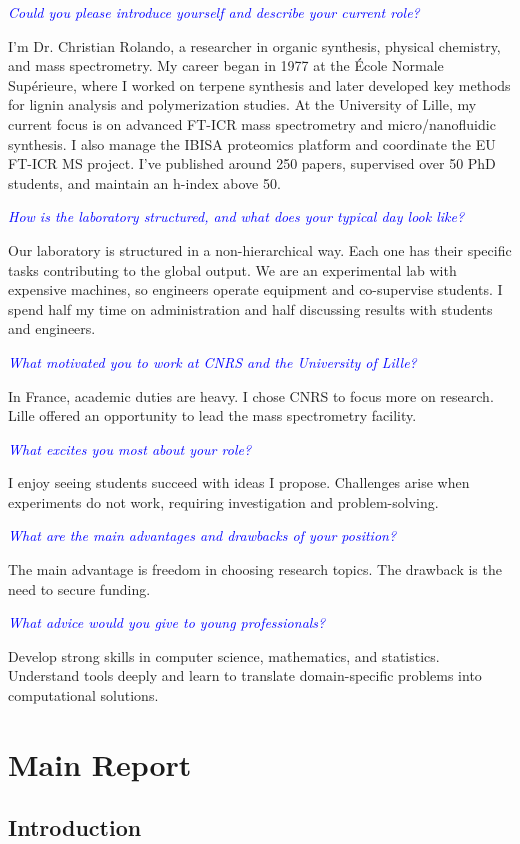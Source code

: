 \documentclass[12pt,a4paper]{report}
\newcommand{\question}[1]{\par\noindent\textcolor{blue}{\textit{#1}}\par}
\newcommand{\answer}[1]{\noindent #1\par\vspace{0.6em}}
\begin{document}
\question{Could you please introduce yourself and describe your current role?}
\answer{I’m Dr. Christian Rolando, a researcher in organic synthesis, physical chemistry, and mass spectrometry. My career began in 1977 at the École Normale Supérieure, where I worked on terpene synthesis and later developed key methods for lignin analysis and polymerization studies. At the University of Lille, my current focus is on advanced FT-ICR mass spectrometry and micro/nanofluidic synthesis. I also manage the IBISA proteomics platform and coordinate the EU FT-ICR MS project. I’ve published around 250 papers, supervised over 50 PhD students, and maintain an h-index above 50.}

\question{How is the laboratory structured, and what does your typical day look like?}
\answer{Our laboratory is structured in a non-hierarchical way. Each one has their specific tasks contributing to the global output. We are an experimental lab with expensive machines, so engineers operate equipment and co-supervise students. I spend half my time on administration and half discussing results with students and engineers.}

\question{What motivated you to work at CNRS and the University of Lille?}
\answer{In France, academic duties are heavy. I chose CNRS to focus more on research. Lille offered an opportunity to lead the mass spectrometry facility.}

\question{What excites you most about your role?}
\answer{I enjoy seeing students succeed with ideas I propose. Challenges arise when experiments do not work, requiring investigation and problem-solving.}

\question{What are the main advantages and drawbacks of your position?}
\answer{The main advantage is freedom in choosing research topics. The drawback is the need to secure funding.}

\question{What advice would you give to young professionals?}
\answer{Develop strong skills in computer science, mathematics, and statistics. Understand tools deeply and learn to translate domain-specific problems into computational solutions.}

\chapter{Main Report}
\section{Introduction}
\end{document}
